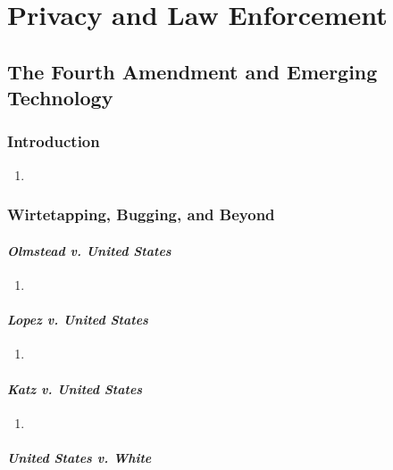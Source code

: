 \section{Privacy and Law Enforcement}

\subsection{The Fourth Amendment and Emerging Technology}

\subsubsection{Introduction}

\begin{enumerate}
    \item %
\end{enumerate}

\subsubsection{Wirtetapping, Bugging, and Beyond}

\paragraph{\emph{Olmstead v. United States}} %

\begin{enumerate}
    \item 
\end{enumerate}

\paragraph{\emph{Lopez v. United States}} %

\begin{enumerate}
    \item 
\end{enumerate}

\paragraph{\emph{Katz v. United States}} %

\begin{enumerate}
    \item 
\end{enumerate}

\paragraph{\emph{United States v. White}} %

